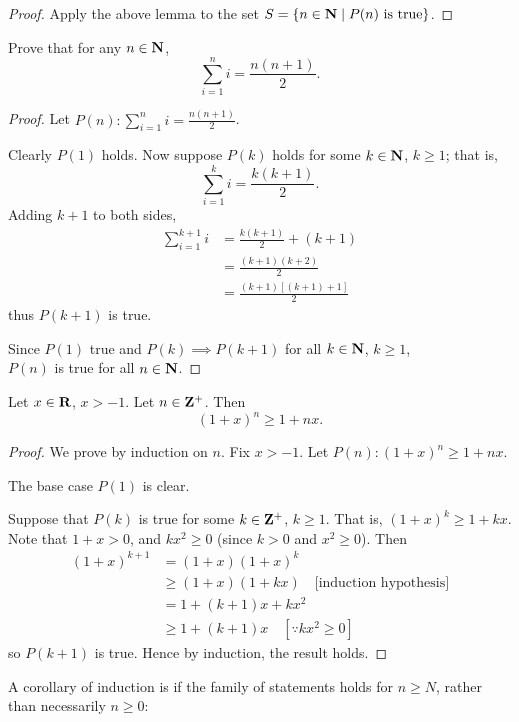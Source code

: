 \begin{proof}
Apply the above lemma to the set $S=\{n\in\mathbf N\mid P(n)\text{ is true}\}$.
\end{proof}

\begin{exercise}
Prove that for any $n\in\mathbf N$,
\[\sum_{i=1}^n i=\frac{n(n+1)}{2}.\]
\end{exercise}

\begin{proof}
Let $\displaystyle P(n):\sum_{i=1}^n i=\frac{n(n+1)}{2}$.

Clearly $P(1)$ holds. Now suppose $P(k)$ holds for some $k\in\mathbf N$, $k\ge1$; that is,
\[\sum_{i=1}^k i=\frac{k(k+1)}{2}.\]
Adding $k+1$ to both sides,
\begin{align*}
\sum_{i=1}^{k+1} i&=\frac{k(k+1)}{2}+(k+1)\\
&=\frac{(k+1)(k+2)}{2}\\
&=\frac{(k+1)[(k+1)+1]}{2}
\end{align*}
thus $P(k+1)$ is true.

Since $P(1)$ true and $P(k)\implies P(k+1)$ for all $k\in\mathbf N$, $k\ge1$,\\
$P(n)$ is true for all $n\in\mathbf N$.
\end{proof}

\begin{exercise}
Let $x\in\mathbf R$, $x>-1$. Let $n\in\mathbf Z^+$. Then
\[(1+x)^n\ge1+nx.\]
\end{exercise}

\begin{proof}
We prove by induction on $n$. Fix $x>-1$. Let $P(n):(1+x)^n\ge1+nx$.

The base case $P(1)$ is clear.

Suppose that $P(k)$ is true for some $k\in\mathbf Z^+$, $k\ge1$. That is, $(1+x)^k\ge1+kx$. Note that $1+x>0$, and $kx^2\ge0$ (since $k>0$ and $x^2\ge0$). Then
\begin{align*}
(1+x)^{k+1}&=(1+x)(1+x)^k\\
&\ge(1+x)(1+kx)\quad\text{[induction hypothesis]}\\
&=1+(k+1)x+kx^2\\
&\ge1+(k+1)x\quad[\because kx^2\ge0]
\end{align*}
so $P(k+1)$ is true. Hence by induction, the result holds.
\end{proof}

A corollary of induction is if the family of statements holds for $n \ge N$, rather than necessarily $n \ge 0$:

